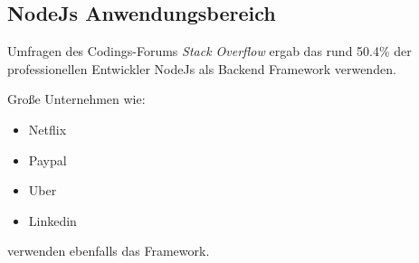 \subsection{NodeJs Anwendungsbereich}
Umfragen des Codings-Forums \textit{Stack Overflow} ergab das rund 50.4\%
der professionellen Entwickler NodeJs als Backend Framework verwenden.

Große Unternehmen wie:
\begin{itemize}
    \item Netflix
    \item Paypal
    \item Uber
    \item Linkedin
\end{itemize}
verwenden ebenfalls das Framework.
\cite{NodeJs1}
\cite{NodeJs2}

